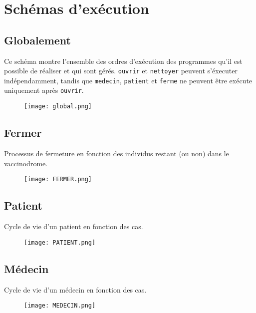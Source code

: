 \documentclass[a4paper]{article}
\begin{document}
\newpage 

\section{Schémas d'exécution}

\subsection{Globalement}

Ce schéma montre l'ensemble des ordres d'exécution des programmes qu'il est possible de réaliser et qui sont gérés. \texttt{ouvrir} et \texttt{nettoyer} peuvent s'éxecuter indépendamment, tandis que \texttt{medecin}, \texttt{patient} et \texttt{ferme} ne peuvent être exécute uniquement après \texttt{ouvrir}.

\begin{figure}[H]
    \centering
    \texttt{[image: global.png]}\\[1cm]
\end{figure}

\subsection{Fermer}
Processus de fermeture en fonction des individus restant (ou non) dans le vaccinodrome.
\begin{figure}[H]
    \centering
    \texttt{[image: FERMER.png]}\\[1cm]
\end{figure}

\newpage

\subsection{Patient}
Cycle de vie d'un patient en fonction des cas.
\begin{figure}[H]
    \centering
    \texttt{[image: PATIENT.png]}\\[1cm]
\end{figure}

\newpage

\subsection{Médecin}
Cycle de vie d'un médecin en fonction des cas.
\begin{figure}[H]
    \centering
    \texttt{[image: MEDECIN.png]}\\[1cm]
\end{figure}
\end{document}
